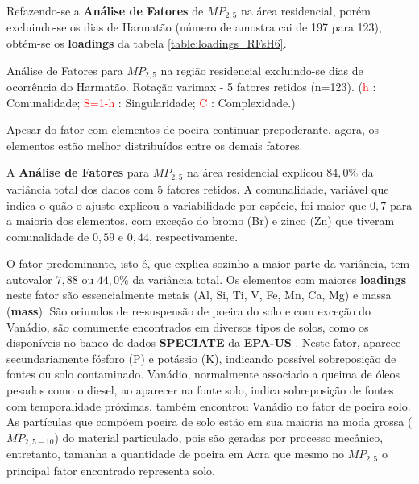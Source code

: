 Refazendo-se a \textbf{Análise de Fatores} de $MP_{2,5}$ na área residencial, 
porém excluindo-se os dias de Harmatão (número de amostra cai de 197 para 123), 
obtém-se os \textbf{loadings} da tabela \ref{table:loadings_RFsH6}. 

\begin{table}[H]
  
  \caption{Análise de Fatores para $MP_{2,5}$ na região residencial
           excluindo-se dias de ocorrência do Harmatão.
           Rotação varimax - 5 fatores retidos (n=123).
           (\textcolor{red}{h} : Comunalidade; 
           \textcolor{red}{S=1-h} : Singularidade; 
           \textcolor{red}{C} : Complexidade.)
           \label{table:loadings_RFsH5}}
\end{table}

Apesar do fator com elementos de poeira continuar prepoderante, agora, os 
elementos estão melhor distribuídos entre os demais fatores.  

A \textbf{Análise de Fatores} para $MP_{2,5}$ na área residencial explicou 
$84,0\%$ da variância total dos dados com 5 fatores retidos.
A comunalidade, variável que indica o quão o ajuste explicou a variabilidade por 
espécie, foi maior que $0,7$ para a maioria dos elementos,
com exceção do bromo (Br) e zinco (Zn) que tiveram comunalidade de $0,59$ e 
$0,44$, respectivamente.

O fator predominante, isto é, que explica sozinho a maior parte da variância, 
tem autovalor $7,88$ ou $44,0\%$ da variância total.
Os elementos com maiores \textbf{loadings} neste fator são essencialmente 
metais (Al, Si, Ti, V, Fe, Mn, Ca, Mg) e massa (\textbf{mass}).
São oriundos de re-suspensão de poeira do solo e com exceção do Vanádio,
são comumente encontrados em diversos tipos de solos, como os disponíveis no 
banco de dados \textbf{SPECIATE} da \textbf{EPA-US} \citep{simon2010}.
Neste fator, aparece secundariamente fósforo (P) e potássio (K), indicando 
possível sobreposição de fontes ou solo contaminado. 
Vanádio, normalmente associado a queima de óleos pesados como o diesel, ao 
aparecer na fonte solo, indica sobreposição de fontes com temporalidade próximas.
\cite{aboh2009} também encontrou Vanádio no fator de poeira solo.
As partículas que compõem poeira de solo estão em sua maioria na moda grossa 
($MP_{2,5-10}$) do material particulado, pois são geradas por processo mecânico,
entretanto, tamanha a quantidade de poeira em Acra que mesmo no $MP_{2,5}$ o 
principal fator encontrado representa solo.  

